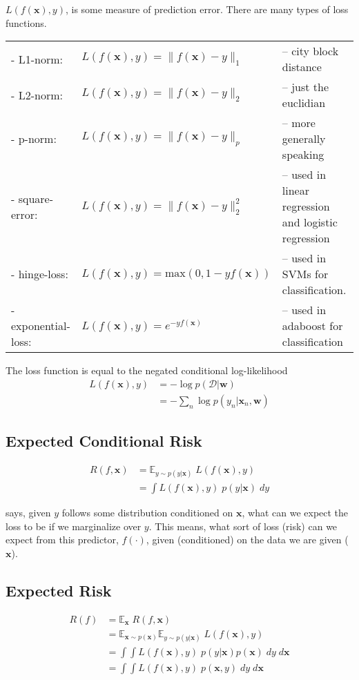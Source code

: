 \documentclass[11pt]{article}
\newcommand{\vct}[1]{\boldsymbol{#1}} %
\newcommand{\ProbOpr}[1]{\mathbb{#1}}
\begin{document}
$L(f(\vct{x}),y)$, is some measure of prediction error. There are many types of loss functions.\\
\begin{tabular}{l l l}
- L1-norm: & $L(f(\vct{x}),y) = \|f(\vct{x}) - y\|_1$& -- city block distance\\
- L2-norm: & $L(f(\vct{x}),y) = \|f(\vct{x}) - y\|_2$ &-- just the euclidian\\
- p-norm: & $L(f(\vct{x}),y) = \|f(\vct{x}) - y\|_p$ &-- more generally speaking\\
- square-error: & $L(f(\vct{x}),y) = \|f(\vct{x}) - y\|_2^2$ &-- used in linear regression and logistic regression\\
- hinge-loss: & $L(f(\vct{x}),y) = \text{max}(0,1-yf(\vct{x}))$ &-- used in SVMs for classification.\\
- exponential-loss: & $L(f(\vct{x}),y) = e^{-yf(\vct{x})}$ &-- used in adaboost for classification\\
\end{tabular}

The loss function is equal to the negated conditional log-likelihood
\begin{align*}
L(f(\vct{x}),y) &= - \log p(\mathcal{D}|\vct{w})\\
&= - \sum_n \log p(y_n|\vct{x}_n,\vct{w})
\end{align*}

\subsection{Expected Conditional Risk}
\begin{align*}
R(f,\vct{x}) &= \ProbOpr{E}_{y \sim p(y|\vct{x})}\;L(f(\vct{x}),y)\\
 &= \int L(f(\vct{x}),y) \;p(y|\vct{x})  \;dy
\end{align*}

says, given $y$ follows some distribution conditioned on $\vct{x}$, what can we expect the loss to be if we marginalize over $y$. This means, what sort of loss (risk) can we expect from this predictor, $f(\cdot)$, given (conditioned) on the data we are given ($\vct{x}$).

\subsection{Expected Risk}
\begin{align*}
R(f) &= \ProbOpr{E}_{\vct{x}} \;R(f,\vct{x})\\
&= \ProbOpr{E}_{\vct{x} \sim p(\vct{x})}\ProbOpr{E}_{y \sim p(y|\vct{x})}\;L(f(\vct{x}),y) \\
&= \int \int L(f(\vct{x}),y) \;p(y|\vct{x}) p(\vct{x})  \;dy \;d\vct{x} \\
&= \int \int L(f(\vct{x}),y) \;p(\vct{x},y) \;dy \;d\vct{x}
\end{align*}
\end{document}
